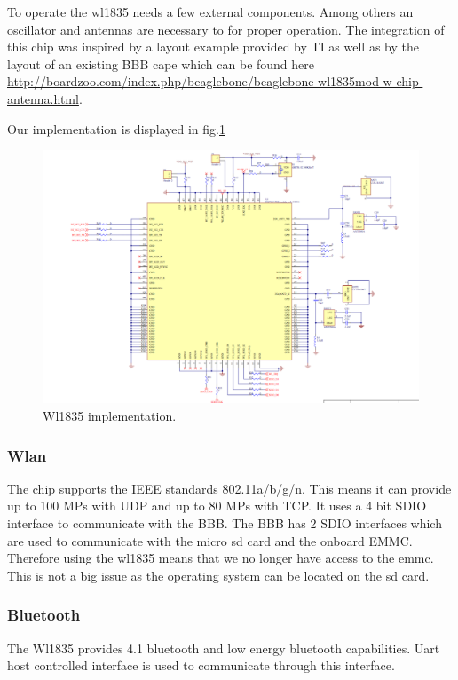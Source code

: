 To operate the wl1835 needs a few external components. Among others an oscillator and antennas are necessary to for proper operation.
The integration of this chip was inspired by a layout example provided by TI as well as by the layout of an existing BBB cape which can be found here \url{http://boardzoo.com/index.php/beaglebone/beaglebone-wl1835mod-w-chip-antenna.html}.

Our implementation is displayed in fig.\ref{fig:wl1835 chip}



\begin{figure}[!htb]
    \centering
    \includegraphics[width=1\textwidth,keepaspectratio]{chap/hardFig/wl1835_chip_sch}
    \caption{Wl1835 implementation.}
    \label{fig:wl1835 chip}
\end{figure}

\subsubsection{Wlan}
The chip supports the IEEE standards 802.11a/b/g/n. This means it can provide up to 100 MPs with UDP and up to 80 MPs with TCP.
It uses a 4 bit SDIO interface to communicate with the BBB. The BBB has 2 SDIO interfaces which are used to communicate with the micro sd card and the onboard EMMC. Therefore using the wl1835 means that we no longer have access to the emmc. This is not a big issue as the operating system can be located on the sd card.


\subsubsection{Bluetooth}
The Wl1835 provides 4.1 bluetooth and low energy bluetooth capabilities. Uart host controlled interface is used to communicate through this interface.

